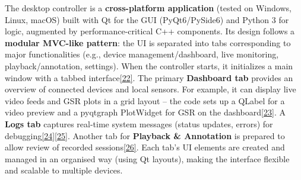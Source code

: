 \documentclass[12pt,a4paper]{article}
\begin{document}
The desktop controller is a \textbf{cross-platform application} (tested on Windows, Linux, macOS) built with Qt for the GUI (PyQt6/PySide6) and Python 3 for logic, augmented by performance-critical C++ components. Its design follows a \textbf{modular MVC-like pattern}: the UI is separated into tabs corresponding to major functionalities (e.g., device management/dashboard, live monitoring, playback/annotation, settings). When the controller starts, it initializes a main window with a tabbed interface\href{https://github.com/buccancs/GSR-Dual-Video-System/blob/05ae360cb7b4ae7c7861f72deb235ad64a74b38e/pc_controller/src/main/main.py\#L112-L120}{{[}22{]}}. The primary \textbf{Dashboard tab} provides an overview of connected devices and local sensors. For example, it can display live video feeds and GSR plots in a grid layout -- the code sets up a QLabel for a video preview and a pyqtgraph PlotWidget for GSR on the dashboard\href{https://github.com/buccancs/GSR-Dual-Video-System/blob/05ae360cb7b4ae7c7861f72deb235ad64a74b38e/pc_controller/src/main/main.py\#L140-L149}{{[}23{]}}. A \textbf{Logs tab} captures real-time system messages (status updates, errors) for debugging\href{https://github.com/buccancs/GSR-Dual-Video-System/blob/05ae360cb7b4ae7c7861f72deb235ad64a74b38e/pc_controller/src/main/main.py\#L114-L122}{{[}24{]}}\href{https://github.com/buccancs/GSR-Dual-Video-System/blob/05ae360cb7b4ae7c7861f72deb235ad64a74b38e/pc_controller/src/main/main.py\#L144-L148}{{[}25{]}}. Another tab for \textbf{Playback \& Annotation} is prepared to allow review of recorded sessions\href{https://github.com/buccancs/GSR-Dual-Video-System/blob/05ae360cb7b4ae7c7861f72deb235ad64a74b38e/pc_controller/src/main/main.py\#L116-L124}{{[}26{]}}. Each tab's UI elements are created and managed in an organised way (using Qt layouts), making the interface flexible and scalable to multiple devices.
\end{document}
